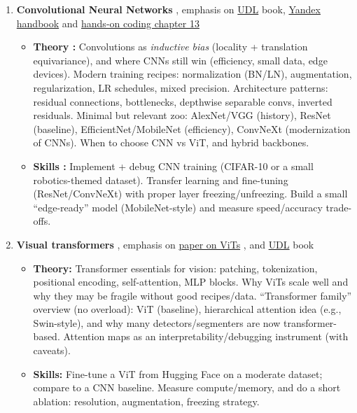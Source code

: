 \documentclass[a4paper,11pt]{texMemo}
\begin{document}
\begin{enumerate}
\item \textbf{Convolutional Neural Networks}
\citep{prince2023understanding, HuggingFaceCVcourse, YandexHandbookML,Goodfellow-et-al-2016,howard2020deep, kiranyaz20211d, li2021survey}, emphasis on \href{https://udlbook.github.io/udlbook/}{UDL} book, \href{https://education.yandex.ru/handbook/ml/article/svyortochnye-nejroseti}{Yandex handbook} \cite{prince2023understanding,YandexHandbookML} and \href{https://github.com/fastai/fastbook/blob/master/13_convolutions.ipynb}{hands-on coding chapter 13} \cite{howard2020deep} 
\begin{itemize}
    \item \textbf{Theory :}
    Convolutions as \emph{inductive bias} (locality + translation equivariance), and where CNNs still win (efficiency, small data, edge devices).
    Modern training recipes: normalization (BN/LN), augmentation, regularization, LR schedules, mixed precision.
    Architecture patterns: residual connections, bottlenecks, depthwise separable convs, inverted residuals.
    Minimal but relevant zoo: AlexNet/VGG (history), ResNet (baseline), EfficientNet/MobileNet (efficiency), ConvNeXt (modernization of CNNs).
    When to choose CNN vs ViT, and hybrid backbones.
    \item \textbf{Skills :}
    Implement + debug CNN training (CIFAR-10 or a small robotics-themed dataset).
    Transfer learning and fine-tuning (ResNet/ConvNeXt) with proper layer freezing/unfreezing.
    Build a small ``edge-ready'' model (MobileNet-style) and measure speed/accuracy trade-offs.
\end{itemize}

\item \textbf{Visual transformers}
\citep{prince2023understanding, vaswani2023attentionneed, dosovitskiy2021imageworth16x16words}, emphasis on \href{https://arxiv.org/abs/2010.11929}{paper on ViTs} \citep{dosovitskiy2021imageworth16x16words}, and \href{https://udlbook.github.io/udlbook/}{UDL} book \citep{prince2023understanding}
\begin{itemize}
    \item \textbf{Theory:}
    Transformer essentials for vision: patching, tokenization, positional encoding, self-attention, MLP blocks.
    Why ViTs scale well and why they may be fragile without good recipes/data.
    ``Transformer family'' overview (no overload): ViT (baseline), hierarchical attention idea (e.g., Swin-style), and why many detectors/segmenters are now transformer-based.
    Attention maps as an interpretability/debugging instrument (with caveats).
    \item \textbf{Skills:}
    Fine-tune a ViT from Hugging Face on a moderate dataset; compare to a CNN baseline.
    Measure compute/memory, and do a short ablation: resolution, augmentation, freezing strategy.
\end{itemize}


\end{enumerate}
\end{document}
